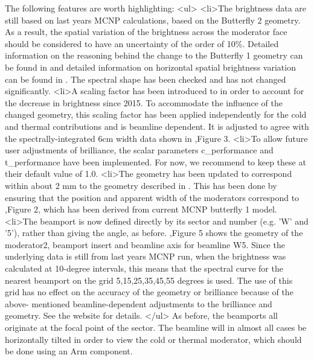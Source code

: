 The following features are worth highlighting: \textless{}ul\textgreater{} \textless{}li\textgreater{}The brightness data are still based on last years MCNP calculations, based on the Butterfly 2 geometry. As a result, the spatial variation of the brightness across the moderator face should be considered to have an uncertainty of the order of 10\%. Detailed information on the reasoning behind the change to the Butterfly 1 geometry can be found in  and detailed information on horizontal spatial brightness variation can be found in . The spectral shape has been checked and has not changed significantly. \textless{}li\textgreater{}A scaling factor has been introduced to in order to account for the decrease in brightness since 2015. To accommodate the influence of the changed geometry, this scaling factor has been applied independently for the cold and thermal contributions and is beamline dependent. It is adjusted to agree with the spectrally-integrated 6cm width data shown in ,Figure 3. \textless{}li\textgreater{}To allow future user adjustments of brilliance, the scalar parameters c\_performance and t\_performance have been implemented. For now, we recommend to keep these at their default value of 1.0. \textless{}li\textgreater{}The geometry has been updated to correspond within about 2 mm to the geometry described in . This has been done by ensuring that the position and apparent width of the moderators correspond to ,Figure 2, which has been derived from current MCNP butterfly 1 model. \textless{}li\textgreater{}The beamport is now defined directly by its sector and number (e.g. 'W' and '5'), rather than giving the angle, as before. ,Figure 5 shows the geometry of the moderator2, beamport insert and beamline axis for beamline W5. Since the underlying data is still from last years MCNP run, when the brightness was calculated at 10-degree intervals, this means that the spectral curve for the nearest beamport on the grid 5,15,25,35,45,55 degrees is used. The use of this grid has no effect on the accuracy of the geometry or brilliance because of the above- mentioned beamline-dependent adjustments to the brilliance and geometry. See the website  for details. \textless{}/ul\textgreater{} As before, the beamports all originate at the focal point of the sector. The beamline will in almost all cases be horizontally tilted in order to view the cold or thermal moderator, which should be done using an Arm component.

